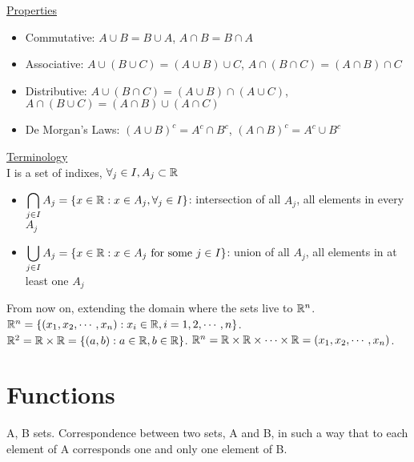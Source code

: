 
\bigskip
\noindent
\underline{Properties}
\begin{itemize}
    \item Commutative: $A\cup B = B\cup A$, $A\cap B = B\cap A$
    \item Associative: $A\cup(B\cup C) = (A\cup B)\cup C$, $A\cap(B\cap C) = (A\cap B)\cap C$
    \item Distributive: $A\cup(B\cap C) = (A\cup B)\cap(A\cup C)$, $A\cap(B\cup C) = (A\cap B)\cup(A\cap C)$
    \item De Morgan's Laws: $(A\cup B)^c = A^c\cap B^c$, $(A\cap B)^c = A^c\cup B^c$
\end{itemize}

\noindent
\underline{Terminology}\bigskip\\
I is a set of indixes, $\forall_j\in I, A_j\subset\mathbb{R}$
\begin{itemize}
    \item $\displaystyle \bigcap_{j\in I} A_j = \{x\in\mathbb{R}:x\in A_j, \forall_j\in I\}$: intersection of all $A_j$, all elements in every $A_j$
    \item $\displaystyle \bigcup_{j\in I} A_j = \{x\in\mathbb{R}:x\in A_j\text{ for some }j\in I\}$: union of all $A_j$, all elements in at least one $A_j$
\end{itemize}

From now on, extending the domain where the sets live to $\mathbb{R}^n$.
$\mathbb{R}^n = \{(x_1,x_2,\cdots,x_n):x_i\in\mathbb{R}, i=1,2,\cdots,n\}$.
$\mathbb{R}^2 = \mathbb{R}\times\mathbb{R} = \{(a,b): a\in\mathbb{R}, b\in\mathbb{R}\}$.
$\mathbb{R}^n = \mathbb{R}\times\mathbb{R}\times\cdots\times\mathbb{R} = (x_1,x_2,\cdots,x_n)$.


\section{Functions}

A, B sets. 
Correspondence between two sets, A and B, in such a way that to each element of A corresponds one and only one element of B.

